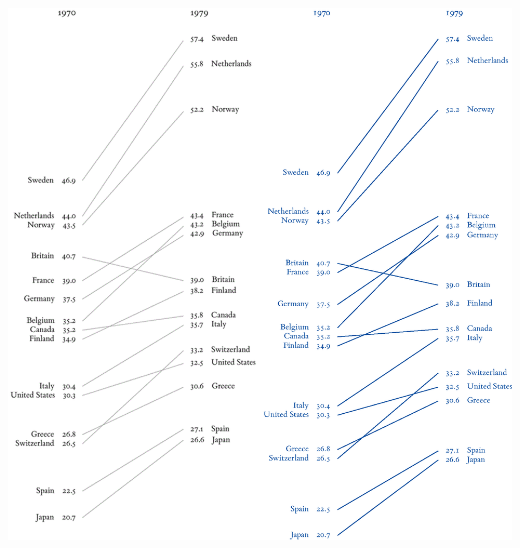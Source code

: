 \documentclass[12pt,twoside]{extarticle}
\begin{document}
\centering \includegraphics[]{TuftesVsMineSBS.eps}
\newpage
\end{document}
